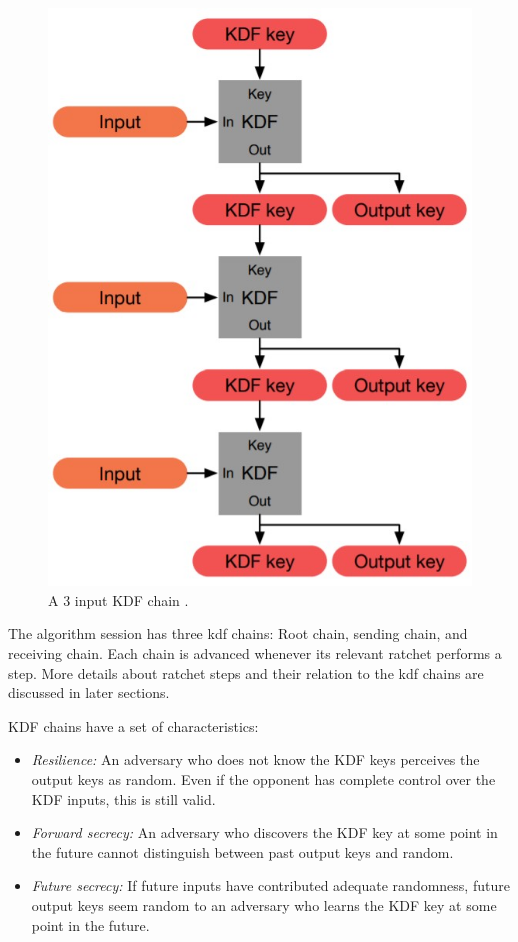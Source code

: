 \begin{figure}[hptb]
	\centering
	\includegraphics[scale=0.4]{Images/kdf-chain.jpg}
	\caption{A 3 input KDF chain \cite{dblRtcht}.}
	\label{fig:kdf-chain}
\end{figure}

The algorithm session has three \gls{kdf} chains: Root chain, sending chain, and receiving chain. Each chain is advanced whenever its relevant ratchet performs a step. More details about ratchet steps and their relation to the \gls{kdf} chains are discussed in later sections.
\par
KDF chains have a set of characteristics:
\begin{itemize}
	\item \textit{Resilience:} An adversary who does not know the KDF keys perceives the output keys as random. Even if the opponent has complete control over the KDF inputs, this is still valid.
	
	\item \textit{Forward secrecy:} An adversary who discovers the KDF key at some point in the future cannot distinguish between past output keys and random.
	
	\item \textit{Future secrecy:} If future inputs have contributed adequate randomness, future output keys seem random to an adversary who learns the KDF key at some point in the future.
\end{itemize}

